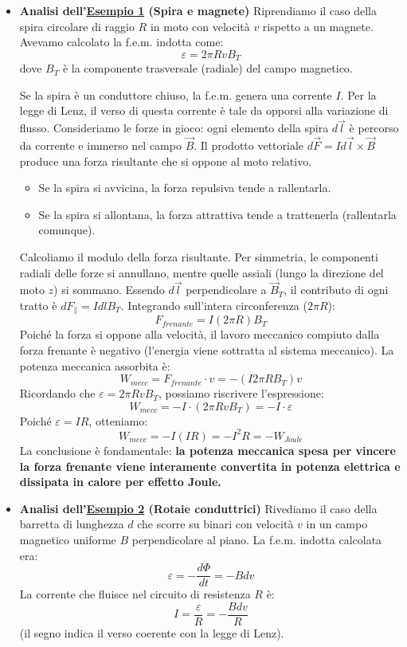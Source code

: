 \documentclass{book}
\begin{document}
\begin{itemize}
\item \textbf{Analisi dell'\hyperlink{Es1}{Esempio 1} (Spira e magnete)}
Riprendiamo il caso della spira circolare di raggio $R$ in moto con velocità $v$ rispetto a un magnete. Avevamo calcolato la f.e.m. indotta come:
$$\varepsilon = 2 \pi R v B_T$$
dove $B_T$ è la componente trasversale (radiale) del campo magnetico.

Se la spira è un conduttore chiuso, la f.e.m. genera una corrente $I$. Per la legge di Lenz, il verso di questa corrente è tale da opporsi alla variazione di flusso.
Consideriamo le forze in gioco: ogni elemento della spira $d\vec{l}$ è percorso da corrente e immerso nel campo $\vec{B}$. Il prodotto vettoriale $d\vec{F} = I d\vec{l} \times \vec{B}$ produce una forza risultante che si oppone al moto relativo.
\begin{itemize}
    \item Se la spira si avvicina, la forza repulsiva tende a rallentarla.
    \item Se la spira si allontana, la forza attrattiva tende a trattenerla (rallentarla comunque).
\end{itemize}

Calcoliamo il modulo della forza risultante. Per simmetria, le componenti radiali delle forze si annullano, mentre quelle assiali (lungo la direzione del moto $z$) si sommano. Essendo $d\vec{l}$ perpendicolare a $\vec{B}_T$, il contributo di ogni tratto è $dF_{\parallel}= I dl B_T$. Integrando sull'intera circonferenza ($2\pi R$):
$$F_{frenante} = I (2 \pi R) B_T$$
Poiché la forza si oppone alla velocità, il lavoro meccanico compiuto dalla forza frenante è negativo (l'energia viene sottratta al sistema meccanico). La potenza meccanica assorbita è:
$$W_{mecc} = F_{frenante} \cdot v = - (I 2\pi R B_T) v$$
Ricordando che $\varepsilon = 2 \pi R v B_T$, possiamo riscrivere l'espressione:
$$W_{mecc} = - I \cdot (2 \pi R v B_T) = - I \cdot \varepsilon$$
Poiché $\varepsilon = IR$, otteniamo:
$$W_{mecc} = - I (IR) = - I^2 R = - W_{Joule}$$
La conclusione è fondamentale: \textbf{la potenza meccanica spesa per vincere la forza frenante viene interamente convertita in potenza elettrica e dissipata in calore per effetto Joule.}

\item \textbf{Analisi dell'\hyperlink{Es2}{Esempio 2} (Rotaie conduttrici)}
Rivediamo il caso della barretta di lunghezza $d$ che scorre su binari con velocità $v$ in un campo magnetico uniforme $B$ perpendicolare al piano.
La f.e.m. indotta calcolata era:
$$\varepsilon = - \frac{d\Phi}{dt} = - B d v$$
La corrente che fluisce nel circuito di resistenza $R$ è:
$$I = \frac{\varepsilon}{R} = -\frac{B d v}{R}$$
(il segno indica il verso coerente con la legge di Lenz).


\end{itemize}
\end{document}

